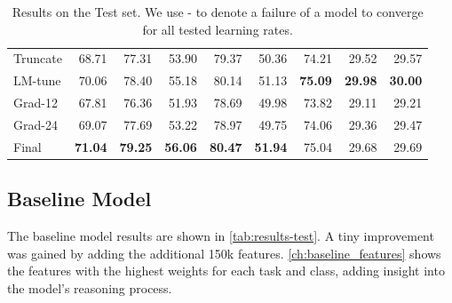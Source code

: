 \begin{table}[h]
{\begin{tabular}{lrrrrrrrr}
            \addlinespace
            Truncate & 68.71                      & 77.31                        & 53.90                      & 79.37                           & 50.36          & 74.21          & 29.52          & 29.57          \\
            LM-tune  & 70.06                      & 78.40                        & 55.18                      & 80.14                           & 51.13          & \textbf{75.09} & \textbf{29.98} & \textbf{30.00} \\
            Grad-12  & 67.81                      & 76.36                        & 51.93                      & 78.69                           & 49.98          & 73.82          & 29.11          & 29.21          \\
            Grad-24  & 69.07                      & 77.69                        & 53.22                      & 78.97                           & 49.75          & 74.06          & 29.36          & 29.47          \\
            \midrule
            Final    & \textbf{71.04}             & \textbf{79.25}               & \textbf{56.06}             & \textbf{80.47}                  & \textbf{51.94} & 75.04          & 29.68          & 29.69          \\
            \bottomrule
        \end{tabular}
        \caption{Results on the Test set. We use - to denote a failure of a model to converge for all tested learning rates.}
        \label{tab:results-test}
    }
\end{table}

\subsection{Baseline Model}
\label{sec:baseline}
The baseline model results are shown in \autoref{tab:results-test}.
A tiny improvement was gained by adding the additional 150k features.
\autoref{ch:baseline_features} shows the features with the highest weights for each task and class,
adding insight into the model's reasoning process.



